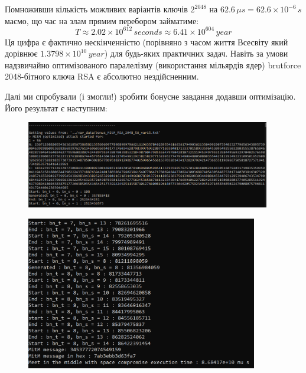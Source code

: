 Помноживши кількість можливих варіантів ключів $2^{2048}$ на $62.6 \, \mu s = 62.6 \times 10^{-6} \, s$ маємо, що час на 
злам прямим перебором займатиме:
\begin{equation*}
    T \approx 2.02 \times 10^{612} \, seconds \approx 6.41 \times 10^{604} \, year
\end{equation*}
Ця цифра є фактично нескінченністю (порівняно з часом життя Всесвіту який дорівнює $1.3798 \times 10^{10} \, year$) для 
будь-яких практичних задач. Навіть за умови надзвичайно оптимізованого паралелізму (використання мільярдів ядер) 
brutforce 2048-бітного ключа RSA є абсолютно нездійсненним.

\newpage %
Далі ми спробували (і змогли!) зробити бонусне завдання додавши оптимізацію. Його результат є наступним:

\begin{figure}[!ht]
    \centering
    \begin{minipage}{0.95\linewidth}
        \includegraphics[width=0.95\textwidth, scale=1.5]{ReportPic/report_7_MitM_bonus.png}
    \end{minipage}
\end{figure}

\begin{figure}[!ht]
    \centering
    \begin{minipage}{0.9\linewidth}
        \includegraphics[width=0.90\textwidth, scale=1.2]{ReportPic/report_8_MitM_bonus.png}
    \end{minipage}
\end{figure}

